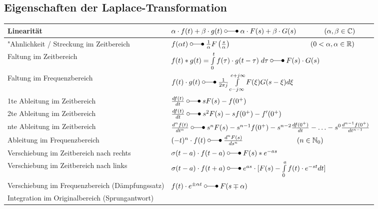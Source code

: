  	\subsection{Eigenschaften der Laplace-Transformation}
  		\renewcommand{\arraystretch}{2}
		\begin{tabular}{|ll|}
	        \hline
	        	Linearität & 
	 			$\alpha\cdot f(t) + \beta\cdot g(t) \; \laplace \; \alpha\cdot F(s) + \beta\cdot G(s) \qquad\qquad (\alpha, \beta \in\mathbb{C})$ \\
			\hline
	 			"Ahnlichkeit / Streckung im Zeitbereich &
	 			$f(\alpha t) \; \laplace \; \frac{1}{\alpha}F \left (\frac{s}{\alpha} \right ) \hspace{4cm} (0 <\alpha, \alpha \in\mathbb{R})$ \\
	 		\hline
	 		\hline
	 			Faltung im Zeitbereich &
	 			$f(t) \ast g(t) = \int\limits_{0}^{t} f(\tau) \cdot g(t-\tau) \; d\tau \; \laplace \; F(s)
	 			\cdot G(s)$\\
	 		\hline
	 			Faltung im Frequenzbereich &
	 			$f(t) \cdot g(t) \; \laplace \; \frac{1}{2\pi j}\int\limits_{c-j\infty}^{c+j\infty}
	 			F(\xi) G(s-\xi)d\xi$ \\
	 		\hline
	 		\hline
	 			1te Ableitung im Zeitbereich &
	 			$\frac{d f(t)}{d t} \; \laplace \; sF(s)
	 			-f(0^+)$ \\
	 		\hline
	 			2te Ableitung im Zeitbereich &
	 			$\frac{d f(t)}{d t} \; \laplace \; s^2F(s)
	 			-sf(0^+) -f'(0^+)$ \\
	 		\hline
	 			nte Ableitung im Zeitbereich &
	 			$\frac{d^n f(t)}{d t^n} \; \laplace \; s^nF(s)
	 			-s^{n-1}f(0^+)-s^{n-2}\frac{d f(0^+)}{d t}-\ldots
	 			-s^0\frac{d^{n-1} f(0^+)}{d t^{n-1}}$ \\
	 		\hline
	 			Ableitung im Frequenzbereich &
		 		$(-t)^n \cdot f(t) \; \laplace \;  \frac{d^n F(s)}{d s^n} \qquad \hspace{2cm} (n \in \mathbb{N}_0)$\\
	 		\hline
	 		\hline
	 			Verschiebung im Zeitbereich nach rechts &
	 			$\sigma(t-a) \cdot f(t - a) \; \laplace \; F(s)*e^{-as}$ \\
	 		\hline
				Verschiebung im Zeitbereich nach links &
				$\sigma(t-a) \cdot f(t + a) \; \laplace \; e^{as} \cdot [F(s) - \int\limits_0^{a} f(t) \cdot e^{-st} dt]$\\
			\hline
	 			Verschiebung im Frequenzbereich (Dämpfungssatz) &
	 			$f(t) \cdot e^{\pm\alpha t} \; \laplace \; F(s\mp\alpha)$ \\
	 		\hline
	 		\hline
	 			Integration im Originalbereich (Sprungantwort)&

\end{tabular}
